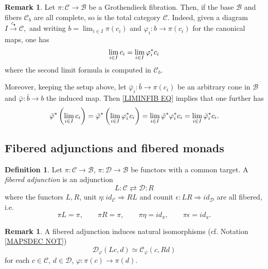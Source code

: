 \documentclass[a4paper,10pt
,draft
]{article}%
\numberwithin{equation}{section}
\numberwithin{figure}{section}
\theoremstyle{definition} %
\newtheorem{definition}[equation]{Definition}%
\newtheorem{remark}[equation]{Remark}%
\newcommand{\1}{\ensuremath{\mathbbm 1}}%
\begin{document}
\begin{remark}\label{LIMINFIBSUP REM}
	Let $\pi \colon \mathcal{C} \to \mathcal{B}$ be a Grothendieck fibration.
	Then, if the base $\mathcal{B}$ and fibers 
	$\mathcal{C}_b$
	are all complete, so is the total category $\mathcal{C}$.
	Indeed, given a diagram $I \xrightarrow{c_{\bullet}} \mathcal{C}$,\
	and writing
	$b = \lim_{i \in I} \pi(c_i)$
	and 
	$\varphi_i \colon b \to \pi(c_i)$
	for the canonical maps,
	one has
	\begin{equation}\label{LIMINFIB EQ}
	\lim_{i \in I} c_i = 
	\lim_{i \in I} \varphi_{i}^{\**}c_i
	\end{equation}
	where the second limit formula is computed in $\mathcal{C}_b$.
	
	Moreover, keeping the setup above, let $\bar{\varphi}_i \colon \bar{b} \to \pi(c_i)$
	be an arbitrary cone in $\mathcal{B}$
	and $\bar{\varphi} \colon \bar{b} \to b$
	the induced map.
	Then \eqref{LIMINFIB EQ} implies that one further has
	\begin{equation}\label{LIMINFIBSUP EQ}
	\bar{\varphi}^{\**}\left(\lim_{i \in I} c_i\right) 
	= 
	\bar{\varphi}^{\**}\left(\lim_{i \in I} \varphi_{i}^{\**}c_i\right)
	=
	\lim_{i \in I} \bar{\varphi}^{\**} \varphi_{i}^{\**}c_i
	=
	\lim_{i \in I} \bar{\varphi}_{i}^{\**}c_i.
	\end{equation}
\end{remark}





\subsection{Fibered adjunctions and fibered monads}
\label{FIBCAT_SEC}



\begin{definition}\label{FIBADJ DEF}
	Let 
	$\pi \colon \mathcal{C} \to \mathcal{B}$,
	$\pi \colon \mathcal{D} \to \mathcal{B}$
	be functors with a common target.
	A \emph{fibered adjunction} is an adjunction
	\[
	L \colon \mathcal{C} \rightleftarrows \mathcal{D} \colon R
	\]
	where the functors $L,R$, 
	unit $\eta \colon id_{\mathcal{C}} \Rightarrow RL$ and 
	counit $\epsilon \colon LR \Rightarrow id_{\mathcal{D}}$
	are all fibered, i.e.
	\[
	\pi L=\pi, \qquad
	\pi R = \pi, \qquad
	\pi \eta = id_{\pi}, \qquad 
	\pi\epsilon = id_{\pi}.
	\]
\end{definition}



\begin{remark}
	A fibered adjunction induces natural isomorphisms
	(cf. Notation \ref{MAPSDEC NOT})
	\[
	\mathcal{D}_{\varphi}\left(Lc,d\right)
	\simeq
	\mathcal{C}_{\varphi}\left(c,Rd\right)
	\]
	for each $c\in \mathcal{C}$, $d \in \mathcal{D}$, 
	$\varphi \colon \pi(c)\to \pi(d)$. 
\end{remark}
\end{document}

